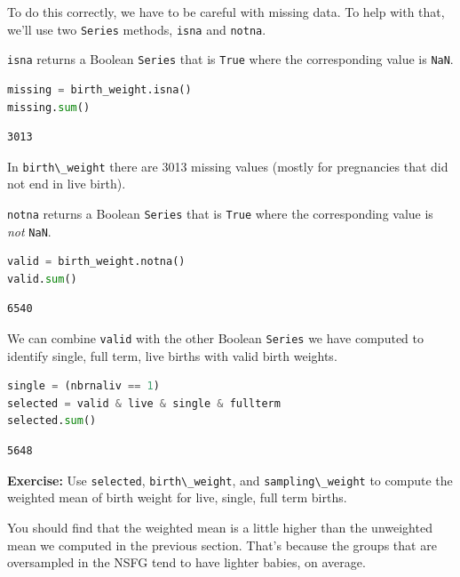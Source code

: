 To do this correctly, we have to be careful with missing data. To help
with that, we'll use two \passthrough{\lstinline!Series!} methods,
\passthrough{\lstinline!isna!} and \passthrough{\lstinline!notna!}.

\passthrough{\lstinline!isna!} returns a Boolean
\passthrough{\lstinline!Series!} that is \passthrough{\lstinline!True!}
where the corresponding value is \passthrough{\lstinline!NaN!}.

\begin{lstlisting}[language=Python]
missing = birth_weight.isna()
missing.sum()
\end{lstlisting}

\begin{lstlisting}[]
3013
\end{lstlisting}

In \passthrough{\lstinline!birth\_weight!} there are 3013 missing values
(mostly for pregnancies that did not end in live birth).

\passthrough{\lstinline!notna!} returns a Boolean
\passthrough{\lstinline!Series!} that is \passthrough{\lstinline!True!}
where the corresponding value is \emph{not}
\passthrough{\lstinline!NaN!}.

\begin{lstlisting}[language=Python]
valid = birth_weight.notna()
valid.sum()
\end{lstlisting}

\begin{lstlisting}[]
6540
\end{lstlisting}

We can combine \passthrough{\lstinline!valid!} with the other Boolean
\passthrough{\lstinline!Series!} we have computed to identify single,
full term, live births with valid birth weights.

\begin{lstlisting}[language=Python]
single = (nbrnaliv == 1)
selected = valid & live & single & fullterm
selected.sum()
\end{lstlisting}

\begin{lstlisting}[]
5648
\end{lstlisting}

\textbf{Exercise:} Use \passthrough{\lstinline!selected!},
\passthrough{\lstinline!birth\_weight!}, and
\passthrough{\lstinline!sampling\_weight!} to compute the weighted mean
of birth weight for live, single, full term births.

You should find that the weighted mean is a little higher than the
unweighted mean we computed in the previous section. That's because the
groups that are oversampled in the NSFG tend to have lighter babies, on
average.

